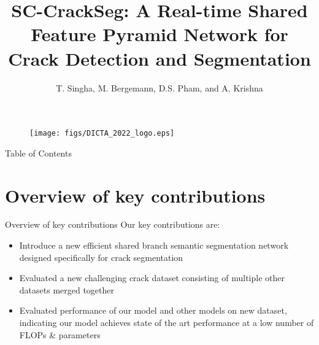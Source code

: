 \documentclass{libs/curtin_format}
\title[SC-CrackSeg]{\huge\textbf{SC-CrackSeg: A Real-time Shared Feature Pyramid
Network for Crack Detection and Segmentation}}
\author{T. Singha, M. Bergemann, D.S. Pham, and A. Krishna}
\institute[Curtin]{
    \normalsize{\email{}}
    \newline
    \department{School of EECMS}
    \curtin
}
\date{}
\begin{document}


\begin{frame}{}	

    \maketitle
	\vspace{-0.4cm}
	\begin{figure}
        \centering        
        \texttt{[image: figs/DICTA\_2022\_logo.eps]}
        \label{fig:logo}
	\end{figure}	

\end{frame}

\begin{frame}{Table of Contents}
        \tableofcontents
\end{frame}

\section{Overview of key contributions}
\begin{frame}{Overview of key contributions}
Our key contributions are:
	\begin{itemize}
		\item Introduce a new efficient shared branch semantic segmentation network designed specifically for crack segmentation
		\item Evaluated a new challenging crack dataset consisting of multiple other datasets merged together
		\item Evaluated performance of our model and other models on new dataset, indicating our model achieves state of the art performance at a low number of FLOPs \& parameters
	\end{itemize}
\end{frame}
\end{document}
